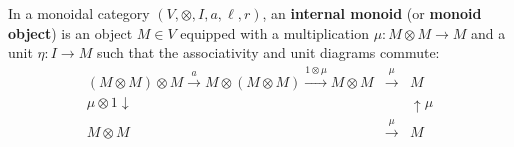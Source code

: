 In a monoidal category $(V, \otimes, I, a, \ell, r)$, an \textbf{internal monoid} (or \textbf{monoid object}) is an object $M \in V$ equipped with a multiplication $\mu: M \otimes M \rightarrow M$ and a unit $\eta: I \rightarrow M$ such that the associativity and unit diagrams commute:
\[
\begin{array}{ccc}
(M \otimes M) \otimes M \xrightarrow{a} M \otimes (M \otimes M) \xrightarrow{1 \otimes \mu} M \otimes M & \xrightarrow{\mu} & M \\
{\scriptstyle \mu \otimes 1}\downarrow & & \uparrow{\scriptstyle \mu} \\
M \otimes M & \xrightarrow{\mu} & M
\end{array}
\]